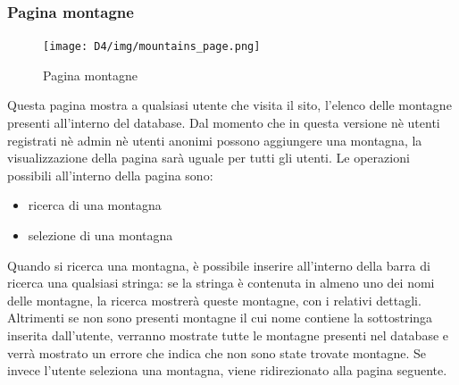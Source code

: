 \documentclass[a4paper,12pt]{article}
\begin{document}
\subsubsection{Pagina montagne}
\begin{figure}[H]
    \centering
    \texttt{[image: D4/img/mountains\_page.png]}
    \caption{Pagina montagne}
\end{figure}
Questa pagina mostra a qualsiasi utente che visita il sito, l'elenco delle montagne presenti all'interno del database. \newline
Dal momento che in questa versione nè utenti registrati nè admin nè utenti anonimi possono aggiungere una montagna, la visualizzazione della pagina sarà uguale per tutti gli utenti.
Le operazioni possibili all'interno della pagina sono:
\begin{itemize}
    \item ricerca di una montagna
    \item selezione di una montagna
\end{itemize}
Quando si ricerca una montagna, è possibile inserire all'interno della barra di ricerca una qualsiasi stringa: se la stringa è contenuta in almeno uno dei nomi delle montagne, la ricerca mostrerà queste montagne, con i relativi dettagli. \newline
Altrimenti se non sono presenti montagne il cui nome contiene la sottostringa inserita dall'utente, verranno mostrate tutte le montagne presenti nel database e verrà mostrato un errore che indica che non sono state trovate montagne. \newline
Se invece l'utente seleziona una montagna, viene ridirezionato alla pagina seguente.
\end{document}
